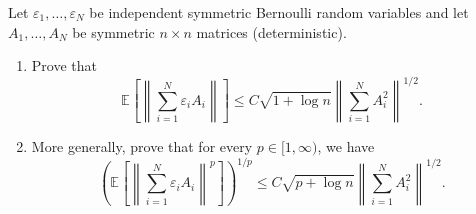\begin{problem*}[Exercise 5.4.13]\label{ex5.4.13}
	Let \(\varepsilon _1, \dots , \varepsilon _N\) be independent symmetric Bernoulli random variables and let \(A_1, \dots , A_N\) be symmetric \(n \times n\) matrices (deterministic).
	\begin{enumerate}
		\item\label{ex5.4.13:a} Prove that
		      \[
			      \mathbb{E}_{}\left[\left\lVert \sum_{i=1}^{N} \varepsilon _i A_i \right\rVert \right]
			      \leq C \sqrt{1 + \log n} \left\lVert \sum_{i=1}^{N} A_i^2 \right\rVert ^{1 / 2}.
		      \]
		\item\label{ex5.4.13:b} More generally, prove that for every \(p \in [1, \infty )\), we have
		      \[
			      \left( \mathbb{E}_{}\left[\left\lVert \sum_{i=1}^{N} \varepsilon _i A_i \right\rVert ^p \right] \right) ^{1 / p}
			      \leq C \sqrt{p + \log n} \left\lVert \sum_{i=1}^{N} A_i^2 \right\rVert ^{1 / 2}.
		      \]
	\end{enumerate}
\end{problem*}
